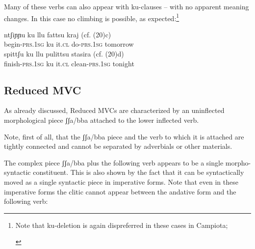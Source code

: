 \documentclass[output=paper]{langscibook}
\begin{document}
Many of these verbs can also appear with ku-clauses -- with no apparent meaning changes. In this case no climbing is possible, as expected:\footnote{Note that ku-deletion is again dispreferred in these cases in Campiota;

\ea \label{fn10ex}
    \z
\z
} 

\ea \label{ac21}
    \ea \label{ac21a}\gll ntʃiɲɲu     ku  llu   fattsu     kraj  (cf. (20)c) \\
     begin-\textsc{prs}.\textsc{1sg}  ku  it.\textsc{cl} do-\textsc{prs}.\textsc{1sg}  tomorrow\\
    \ex \label{ac21b}\gll spittʃu      ku  llu   pulittsu     stasira (cf. (20)d) \\
     finish-\textsc{prs}.\textsc{1sg} ku it.\textsc{cl} clean-\textsc{prs}.\textsc{1sg}  tonight\\
    \z
\z


\subsection{Reduced MVC}

As already discussed, Reduced MVCs are characterized by an uninflected morphological piece ʃʃa/bba attached to the lower inflected verb.   

Note, first of all, that the ʃʃa/bba piece and the verb to which it is attached are tightly connected and cannot be separated by adverbials or other materials. 

\ea \label{ac22}
  \z
\z

The complex piece ʃʃa/bba plus the following verb appears to be a single morpho-syntactic constituent.  This is also shown by the fact that it can be syntactically moved as a single syntactic piece in imperative forms. Note that even in these imperative forms the clitic cannot appear between the andative form and the following verb:
\end{document}
